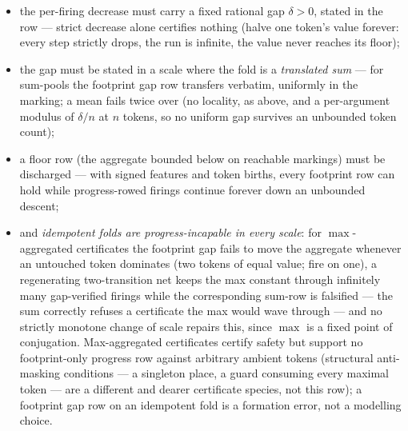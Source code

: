 \begin{itemize}
\item the per-firing decrease must carry a fixed rational gap
  $\delta > 0$, stated in the row --- strict decrease alone
  certifies nothing (halve one token's value forever: every step
  strictly drops, the run is infinite, the value never reaches its
  floor);
\item the gap must be stated in a scale where the fold is a
  \emph{translated sum} --- for sum-pools the footprint gap row
  transfers verbatim, uniformly in the marking; a mean fails twice
  over (no locality, as above, and a per-argument modulus of
  $\delta/n$ at $n$ tokens, so no uniform gap survives an unbounded
  token count);
\item a floor row (the aggregate bounded below on reachable
  markings) must be discharged --- with signed features and token
  births, every footprint row can hold while progress-rowed firings
  continue forever down an unbounded descent;
\item and \emph{idempotent folds are progress-incapable in every
  scale}: for $\max$-aggregated certificates the footprint gap fails
  to move the aggregate whenever an untouched token dominates (two
  tokens of equal value; fire on one), a regenerating two-transition net
  keeps the max constant through infinitely many gap-verified
  firings while the corresponding sum-row is falsified --- the sum
  correctly refuses a certificate the max would wave through --- and
  no strictly monotone change of scale repairs this, since $\max$ is
  a fixed point of conjugation. Max-aggregated certificates certify
  safety but support no footprint-only progress row against
  arbitrary ambient tokens (structural anti-masking conditions --- a
  singleton place, a guard consuming every maximal token --- are a
  different and dearer certificate species, not this row); a
  footprint gap row on an idempotent fold is a formation error, not
  a modelling choice.
\end{itemize}

